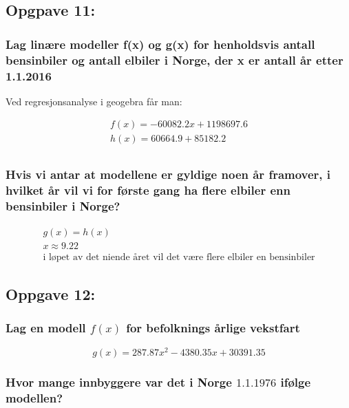 \documentclass{article}
\begin{document}
\subsection{Opgpave 11: }

\subsubsection{Lag linære modeller f(x) og g(x) for henholdsvis antall bensinbiler og antall elbiler i Norge, der x er antall år etter 1.1.2016}

Ved regresjonsanalyse i geogebra får man:

\begin{align*}
    f(x)=-60082.2x + 1198697.6 \\
    h(x)=60664.9 + 85182.2 \\
\end{align*}

\subsubsection{Hvis vi antar at modellene er gyldige noen år framover, i hvilket år vil vi for første gang ha flere elbiler enn bensinbiler i Norge?}

\begin{align*}
    g(x)=h(x) \\
    x \approx 9.22 \\
    \text{i løpet av det niende året vil det være flere elbiler en bensinbiler}
\end{align*}

\subsection{Oppgave 12:}  

\subsubsection{Lag en modell $f(x)$ for befolknings årlige vekstfart}


$$g(x)=287.87x^2-4380.35x + 30391.35$$

\subsubsection{Hvor mange innbyggere var det i Norge $1.1.1976$ ifølge modellen?}
\end{document}
